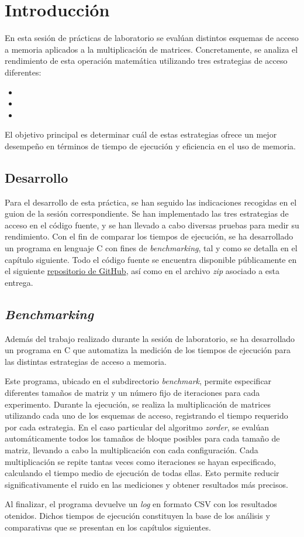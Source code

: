 \pagestyle{fancy}
\fancyhead[l]{\autorUO}
\fancyfoot[l]{\asignaturaAbbr}
\fancyfoot[r]{\fecha}

\section{Introducción}
En esta sesión de prácticas de laboratorio se evalúan distintos esquemas de acceso a memoria aplicados a la multiplicación de matrices.
Concretamente, se analiza el rendimiento de esta operación matemática utilizando tres estrategias de acceso diferentes:

\begin{itemize}
    \item \rowmajor
    \item \colmajor
    \item \zorder
\end{itemize}
El objetivo principal es determinar cuál de estas estrategias ofrece un mejor desempeño en términos de tiempo de ejecución y 
eficiencia en el uso de memoria.

\subsection{Desarrollo}
Para el desarrollo de esta práctica, se han seguido las indicaciones recogidas en el guion de la sesión correspondiente. 
Se han implementado las tres estrategias de acceso en el código fuente, y se han llevado a cabo diversas pruebas para medir su rendimiento.
Con el fin de comparar los tiempos de ejecución, se ha desarrollado un programa en lenguaje C con fines de \textit{benchmarking}, 
tal y como se detalla en el capítulo siguiente. Todo el código fuente se encuentra disponible públicamente en el siguiente 
\href{https://github.com/rubennmg/CAP/tree/main/sesion1}{repositorio de GitHub}, así como en el archivo \textit{zip} asociado a esta entrega.

\subsection{\textit{Benchmarking}}
Además del trabajo realizado durante la sesión de laboratorio, se ha desarrollado un programa en C que automatiza la medición 
de los tiempos de ejecución para las distintas estrategias de acceso a memoria. 

Este programa, ubicado en el subdirectorio \textit{benchmark}, permite especificar diferentes tamaños de matriz y un número fijo de iteraciones para cada experimento.
Durante la ejecución, se realiza la multiplicación de matrices utilizando cada uno de los esquemas de acceso, registrando el 
tiempo requerido por cada estrategia. En el caso particular del algoritmo \textit{zorder}, se evalúan automáticamente todos los tamaños 
de bloque posibles para cada tamaño de matriz, llevando a cabo la multiplicación con cada configuración.
Cada multiplicación se repite tantas veces como iteraciones se hayan especificado, calculando el tiempo medio de ejecución de todas ellas. 
Esto permite reducir significativamente el ruido en las mediciones y obtener resultados más precisos.

Al finalizar, el programa devuelve un \textit{log} en formato CSV con los resultados otenidos. 
Dichos tiempos de ejecución constituyen la base de los análisis y comparativas que se presentan en los capítulos siguientes.
